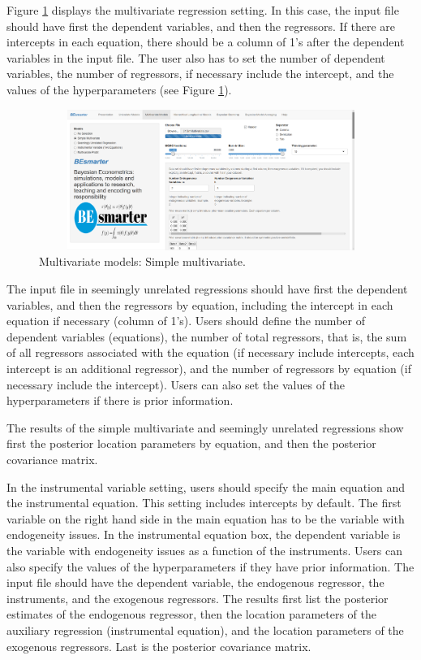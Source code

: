 Figure \ref{fig66} displays the multivariate regression setting. In this case, the input file should have first the dependent variables, and then the regressors. If there are intercepts in each equation, there should be a column of 1's after the dependent variables in the input file. The user also has to set the number of dependent variables, the number of regressors, if necessary include the intercept, and the values of the hyperparameters (see Figure \ref{fig66}).

\begin{figure}
	\includegraphics[width=340pt, height=130pt]{Chapters/chapterGUI/figures/Figure6.png}
	\caption[List of figure caption goes here]{Multivariate models: Simple multivariate.}\label{fig66}
\end{figure}

The input file in seemingly unrelated regressions should have first the dependent variables, and then the regressors by equation, including the intercept in each equation if necessary (column of 1's). Users should define the number of dependent variables (equations), the number of total regressors, that is, the sum of all regressors associated with the equation (if necessary include intercepts, each intercept is an additional regressor), and the number of regressors by equation (if necessary include the intercept). Users can also set the values  of the hyperparameters if there is prior information.

The results of the simple multivariate and seemingly unrelated regressions show first the posterior location parameters by equation, and then the posterior covariance matrix.

In the instrumental variable setting, users should specify the main equation and the instrumental equation. This setting includes intercepts by default. The first variable on the right hand side in the main equation has to be the variable with endogeneity issues. In the instrumental equation box, the dependent variable is the variable with endogeneity issues as a function of the instruments. Users can also specify the values of the hyperparameters if they have prior information. The input file should have the dependent variable, the endogenous regressor, the instruments, and the exogenous regressors. The results first list the posterior estimates of the endogenous regressor, then the location parameters of the auxiliary regression (instrumental equation), and the location parameters of the exogenous regressors. Last is the posterior covariance matrix.

